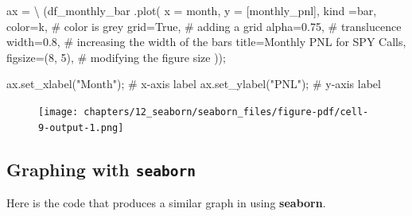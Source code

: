 \documentclass[
  letterpaper,
  DIV=11,
  numbers=noendperiod]{scrreprt}
\newenvironment{Shaded}{\begin{snugshade}}{\end{snugshade}}
\newcommand{\CommentTok}[1]{\textcolor[rgb]{0.37,0.37,0.37}{#1}}
\newcommand{\DecValTok}[1]{\textcolor[rgb]{0.68,0.00,0.00}{#1}}
\newcommand{\FloatTok}[1]{\textcolor[rgb]{0.68,0.00,0.00}{#1}}
\newcommand{\NormalTok}[1]{\textcolor[rgb]{0.00,0.23,0.31}{#1}}
\newcommand{\OperatorTok}[1]{\textcolor[rgb]{0.37,0.37,0.37}{#1}}
\newcommand{\StringTok}[1]{\textcolor[rgb]{0.13,0.47,0.30}{#1}}
\newcommand{\VariableTok}[1]{\textcolor[rgb]{0.07,0.07,0.07}{#1}}
\begin{document}
\begin{Shaded}
\begin{Highlighting}[]
\NormalTok{ax }\OperatorTok{=} \OperatorTok{\textbackslash{}}
\NormalTok{    (df\_monthly\_bar}
\NormalTok{        .plot(}
\NormalTok{            x }\OperatorTok{=} \StringTok{\textquotesingle{}month\textquotesingle{}}\NormalTok{,}
\NormalTok{            y }\OperatorTok{=}\NormalTok{ [}\StringTok{\textquotesingle{}monthly\_pnl\textquotesingle{}}\NormalTok{],}
\NormalTok{            kind }\OperatorTok{=}\StringTok{\textquotesingle{}bar\textquotesingle{}}\NormalTok{,}
\NormalTok{            color}\OperatorTok{=}\StringTok{\textquotesingle{}k\textquotesingle{}}\NormalTok{, }\CommentTok{\# color is grey}
\NormalTok{            grid}\OperatorTok{=}\VariableTok{True}\NormalTok{, }\CommentTok{\# adding a grid}
\NormalTok{            alpha}\OperatorTok{=}\FloatTok{0.75}\NormalTok{, }\CommentTok{\# translucence}
\NormalTok{            width}\OperatorTok{=}\FloatTok{0.8}\NormalTok{, }\CommentTok{\# increasing the width of the bars}
\NormalTok{            title}\OperatorTok{=}\StringTok{\textquotesingle{}Monthly PNL for SPY Calls\textquotesingle{}}\NormalTok{,}
\NormalTok{            figsize}\OperatorTok{=}\NormalTok{(}\DecValTok{8}\NormalTok{, }\DecValTok{5}\NormalTok{), }\CommentTok{\# modifying the figure size}
\NormalTok{        ))}\OperatorTok{;}

\NormalTok{ax.set\_xlabel(}\StringTok{"Month"}\NormalTok{)}\OperatorTok{;} \CommentTok{\# x{-}axis label}
\NormalTok{ax.set\_ylabel(}\StringTok{"PNL"}\NormalTok{)}\OperatorTok{;}   \CommentTok{\# y{-}axis label}
\end{Highlighting}
\end{Shaded}

\begin{figure}[H]

{\centering \texttt{[image: chapters/12\_seaborn/seaborn\_files/figure-pdf/cell-9-output-1.png]}

}

\end{figure}

\hypertarget{graphing-with-seaborn-1}{%
\subsection{\texorpdfstring{Graphing with
\texttt{seaborn}}{Graphing with seaborn}}\label{graphing-with-seaborn-1}}

Here is the code that produces a similar graph in using
\textbf{seaborn}.
\end{document}
